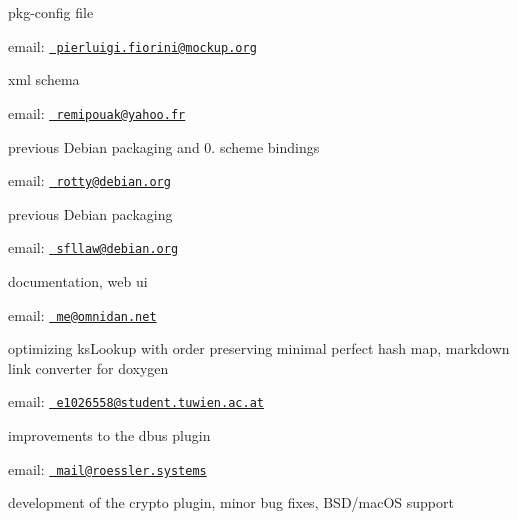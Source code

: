 pkg-\/config file


\begin{DoxyItemize}
\item email\+: \href{mailto:pierluigi.fiorini@mockup.org}{\texttt{ pierluigi.\+fiorini@mockup.\+org}}
\end{DoxyItemize}

xml schema


\begin{DoxyItemize}
\item email\+: \href{mailto:remipouak@yahoo.fr}{\texttt{ remipouak@yahoo.\+fr}}
\end{DoxyItemize}

previous Debian packaging and 0. scheme bindings


\begin{DoxyItemize}
\item email\+: \href{mailto:rotty@debian.org}{\texttt{ rotty@debian.\+org}}
\end{DoxyItemize}

previous Debian packaging


\begin{DoxyItemize}
\item email\+: \href{mailto:sfllaw@debian.org}{\texttt{ sfllaw@debian.\+org}}
\end{DoxyItemize}

documentation, web ui


\begin{DoxyItemize}
\item email\+: \href{mailto:me@omnidan.net}{\texttt{ me@omnidan.\+net}}
\end{DoxyItemize}

optimizing ks\+Lookup with order preserving minimal perfect hash map, markdown link converter for doxygen


\begin{DoxyItemize}
\item email\+: \href{mailto:e1026558@student.tuwien.ac.at}{\texttt{ e1026558@student.\+tuwien.\+ac.\+at}}
\end{DoxyItemize}

improvements to the dbus plugin


\begin{DoxyItemize}
\item email\+: \href{mailto:mail@roessler.systems}{\texttt{ mail@roessler.\+systems}}
\end{DoxyItemize}

development of the crypto plugin, minor bug fixes, B\+S\+D/mac\+OS support


